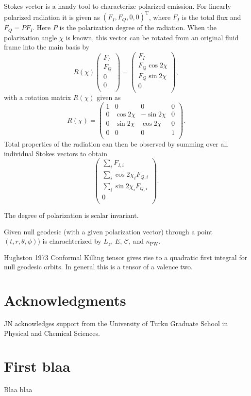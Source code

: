 \documentclass[iop, usenatbib]{emulateapj}
\newcommand{\be}{\begin{equation}}
\newcommand{\ee}{\end{equation}}
\newcommand{\Ca}{\ensuremath{\mathcal{C}}}
\newcommand{\kpw}{\ensuremath{\kappa_{\mathrm{PW}}}}
\begin{document}
Stokes vector is a handy tool to characterize polarized emission.
For linearly polarized radiation it is given as $(F_I, F_Q, 0, 0)^{\mathrm{T}}$, where $F_I$ is the total flux and $F_Q = P F_I$.
Here $P$ is the polarization degree of the radiation.
When the polarization angle $\chi$ is known, this vector can be rotated from an original fluid frame into the main basis by 
\be
R(\chi) 
\begin{pmatrix}
F_I \\
F_Q \\
0   \\
0   \\
\end{pmatrix}
=
\begin{pmatrix}
F_I \\
F_Q \cos 2\chi\\
F_Q \sin 2\chi  \\
0   \\
\end{pmatrix},
\ee
with a rotation matrix $R(\chi)$ given as
\be
R(\chi) = 
\begin{pmatrix}
1 & 0 & 0 & 0 \\
0 & \cos 2\chi & -\sin 2\chi & 0 \\
0 & \sin 2\chi & \cos 2\chi & 0 \\
0 & 0 & 0 & 1 \\
\end{pmatrix}.
\ee
Total properties of the radiation can then be observed by summing over all individual Stokes vectors to obtain
\be
\begin{pmatrix}
\sum_i F_{I,i} \\[0.3em]
\sum_i \cos 2\chi_i F_{Q,i} \\[0.3em]
\sum_i \sin 2\chi_i F_{Q,i} \\[0.3em]
0 \\
\end{pmatrix}.
\ee

The degree of polarization is scalar invariant.


Given null geodesic (with a given polarization vector) through a point $(t,r,\theta,\phi)$) is charachterized by $L_z$, $E$, $\Ca$, and $\kpw$.

Hughston 1973
Conformal Killing tensor gives rise to a quadratic first integral for null geodesic orbits. 
In general this is a tensor of a valence two.





\section*{Acknowledgments}
JN acknowledges support from the University of Turku Graduate School in Physical and Chemical Sciences.



\clearpage






\clearpage
\appendix

\section{First blaa}
Blaa blaa
\end{document}
